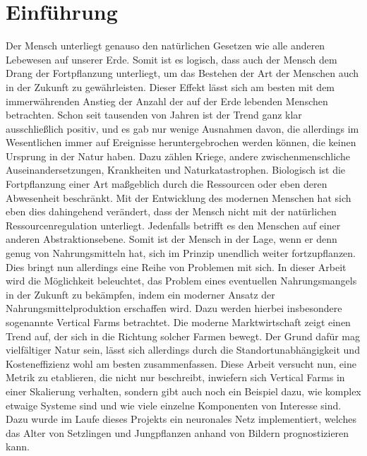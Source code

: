 \tableofcontents
\newpage
\section{Einführung}
Der Mensch unterliegt genauso den natürlichen Gesetzen wie alle anderen Lebewesen auf unserer Erde. Somit ist es logisch, dass auch der Mensch dem Drang der Fortpflanzung unterliegt, um das Bestehen der Art der Menschen auch in der Zukunft zu gewährleisten. Dieser Effekt lässt sich am besten mit dem immerwährenden Anstieg der Anzahl der auf der Erde lebenden Menschen betrachten. Schon seit tausenden von Jahren ist der Trend ganz klar ausschließlich positiv, und es gab nur wenige Ausnahmen davon, die allerdings im Wesentlichen immer auf Ereignisse heruntergebrochen werden können, die keinen Ursprung in der Natur haben. Dazu zählen Kriege, andere zwischenmenschliche Auseinandersetzungen, Krankheiten und Naturkatastrophen. Biologisch ist die Fortpflanzung einer Art maßgeblich durch die Ressourcen oder eben deren Abwesenheit beschränkt. Mit der Entwicklung des modernen Menschen hat sich eben dies dahingehend verändert, dass der Mensch nicht mit der natürlichen Ressourcenregulation unterliegt. Jedenfalls betrifft es den Menschen auf einer anderen Abstraktionsebene. Somit ist der Mensch in der Lage, wenn er denn genug von Nahrungsmitteln hat, sich im Prinzip unendlich weiter fortzupflanzen. Dies bringt nun allerdings eine Reihe von Problemen mit sich. In dieser Arbeit wird die Möglichkeit beleuchtet, das Problem eines eventuellen Nahrungsmangels in der Zukunft zu bekämpfen, indem ein moderner Ansatz der Nahrungsmittelproduktion erschaffen wird. Dazu werden hierbei insbesondere sogenannte Vertical Farms betrachtet. Die moderne Marktwirtschaft zeigt einen Trend auf, der sich in die Richtung solcher Farmen bewegt. Der Grund dafür mag vielfältiger Natur sein, lässt sich allerdings durch die Standortunabhängigkeit und Kosteneffizienz wohl am besten zusammenfassen. Diese Arbeit versucht nun, eine Metrik zu etablieren, die nicht nur beschreibt, inwiefern sich Vertical Farms in einer Skalierung verhalten, sondern gibt auch noch ein Beispiel dazu, wie komplex etwaige Systeme sind und wie viele einzelne Komponenten von Interesse sind. Dazu wurde im Laufe dieses Projekts ein neuronales Netz implementiert, welches das Alter von Setzlingen und Jungpflanzen anhand von Bildern prognostizieren kann.
